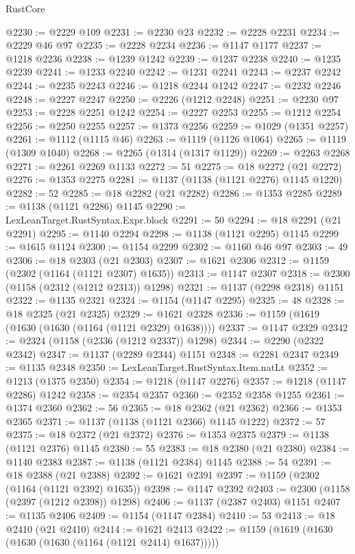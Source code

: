 \begin{lexlean}{RustCore}
\begin{coremodule}
@2230 := @2229 @109
@2231 := @2230 @23
@2232 := @2228 @2231
@2234 := @2229 @46 @97
@2235 := @2228 @2234
@2236 := @1147 @1177
@2237 := @1218 @2236
@2238 := @1239 @1242
@2239 := @1237 @2238
@2240 := @1235 @2239
@2241 := @1233 @2240
@2242 := @1231 @2241
@2243 := @2237 @2242
@2244 := @2235 @2243
@2246 := @1218 @2244 @1242
@2247 := @2232 @2246
@2248 := @2227 @2247
@2250 := @2226 (@1212 @2248)
@2251 := @2230 @97
@2253 := @2228 @2251 @1242
@2254 := @2227 @2253
@2255 := @1212 @2254
@2256 := @2250 @2255
@2257 := @1373 @2256
@2259 := @1029 (@1351 @2257)
@2261 := @1112 (@1115 @46)
@2263 := @1119 (@1126 @1064)
@2265 := @1119 (@1309 @1040)
@2268 := @2265 (@1314 (@1317 @1129))
@2269 := @2263 @2268
@2271 := @2261 @2269 @1133
@2272 := 51
@2275 := @18 @2272 (@21 @2272)
@2276 := @1353 @2275
@2281 := @1137 (@1138 (@1121 @2276) @1145 @1220)
@2282 := 52
@2285 := @18 @2282 (@21 @2282)
@2286 := @1353 @2285
@2289 := @1138 (@1121 @2286) @1145
@2290 := LexLeanTarget.RustSyntax.Expr.block
@2291 := 50
@2294 := @18 @2291 (@21 @2291)
@2295 := @1140 @2294
@2298 := @1138 (@1121 @2295) @1145
@2299 := @1615 @1124
@2300 := @1154 @2299
@2302 := @1160 @46 @97
@2303 := 49
@2306 := @18 @2303 (@21 @2303)
@2307 := @1621 @2306
@2312 := @1159 (@2302 (@1164 (@1121 @2307) @1635))
@2313 := @1147 @2307
@2318 := @2300 (@1158 (@2312 (@1212 @2313)) @1298)
@2321 := @1137 (@2298 @2318) @1151
@2322 := @1135 @2321
@2324 := @1154 (@1147 @2295)
@2325 := 48
@2328 := @18 @2325 (@21 @2325)
@2329 := @1621 @2328
@2336 := @1159 (@1619 (@1630 (@1630 (@1164 (@1121 @2329) @1638))))
@2337 := @1147 @2329
@2342 := @2324 (@1158 (@2336 (@1212 @2337)) @1298)
@2344 := @2290 (@2322 @2342)
@2347 := @1137 (@2289 @2344) @1151
@2348 := @2281 @2347
@2349 := @1135 @2348
@2350 := LexLeanTarget.RustSyntax.Item.natLt
@2352 := @1213 (@1375 @2350)
@2354 := @1218 (@1147 @2276)
@2357 := @1218 (@1147 @2286) @1242
@2358 := @2354 @2357
@2360 := @2352 @2358 @1255
@2361 := @1374 @2360
@2362 := 56
@2365 := @18 @2362 (@21 @2362)
@2366 := @1353 @2365
@2371 := @1137 (@1138 (@1121 @2366) @1145 @1222)
@2372 := 57
@2375 := @18 @2372 (@21 @2372)
@2376 := @1353 @2375
@2379 := @1138 (@1121 @2376) @1145
@2380 := 55
@2383 := @18 @2380 (@21 @2380)
@2384 := @1140 @2383
@2387 := @1138 (@1121 @2384) @1145
@2388 := 54
@2391 := @18 @2388 (@21 @2388)
@2392 := @1621 @2391
@2397 := @1159 (@2302 (@1164 (@1121 @2392) @1635))
@2398 := @1147 @2392
@2403 := @2300 (@1158 (@2397 (@1212 @2398)) @1298)
@2406 := @1137 (@2387 @2403) @1151
@2407 := @1135 @2406
@2409 := @1154 (@1147 @2384)
@2410 := 53
@2413 := @18 @2410 (@21 @2410)
@2414 := @1621 @2413
@2422 := @1159 (@1619 (@1630 (@1630 (@1630 (@1164 (@1121 @2414) @1637)))))

\end{coremodule}
\end{lexlean}
